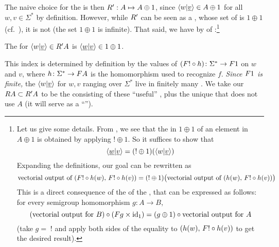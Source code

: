 The naive choice for the  is then $\functorr' : A \mapsto A
\oplus 1$, since $\langle w|\underline{v} \rangle \in A\oplus1$ for all $w,v\in\Sigma^*$
by definition. However, while $\functorr'$ can be seen as a , whose set of  is $1 \oplus 1$
(cf.~), it is not  (the set $1\oplus1$ is infinite). That said, we have by
 of :\footnote{Let us give some details. From , we see that the  in $1 \oplus 1$ of an element in $A \oplus 1$ is obtained by applying $!\oplus1$. So it suffices to show that
  \[\langle \underline{w}|\underline{v} \rangle = (!\oplus1)(\langle w|\underline{v} \rangle) \]
  Expanding the definitions, our goal can be rewritten as
  \[ \text{vectorial output of}\ (\functor! \circ h(w),\, \functor! \circ h(v)) = (!\oplus1)\big(\text{vectorial output of}\ (h(w),\, \functor! \circ h(v))\big) \]
  This is a direct consequence of the  of the , that can be expressed as follows: for every semigroup homomorphism $g\colon A \to B$,
  \[ (\text{vectorial output for $B$}) \circ (\functor g \times \mathrm{id}_1) = (g\oplus1) \circ \text{vectorial output for $A$} \]
  (take $g=\;!$ and apply both sides of the equality to $(h(w),\, \functor! \circ h(v))$ to get the desired result).}
\begin{claim}\label{clm:component-index}
  The  for $\tuple{w|\underline{v}} \in \functorr'A$ is $\langle \underline{w}|\underline{v} \rangle \in 1 \oplus 1$.
\end{claim}
This index is determined by definition by the values of $(\functor! \circ h)
\colon \Sigma^* \to \functor1$ on $w$ and $v$, where
$h\colon\Sigma^*\to\functor A$ is the homomorphism used to recognize $f$. \emph{Since $\functor1$ is finite,} the $\langle w|\underline{v} \rangle$ for $w,v$ ranging over $\Sigma^*$ live in finitely many . We take our   $\functorr A \subset \functorr' A$ to be the  consisting of these \enquote{useful} , plus the unique  that does not use $A$ (it will serve as a \enquote{}).

